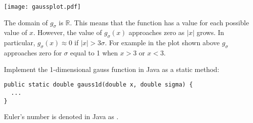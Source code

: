 \documentclass{book}
\begin{document}
\begin{center}
\texttt{[image: gaussplot.pdf]}
\end{center}

The domain of $g_\sigma$ is $\mathbb{R}$. This means that the function has a value for each possible value of $x$. However, the value of $g_\sigma(x)$ approaches zero as $|x|$ grows. In particular, $g_\sigma(x) \approx 0$ if $|x| > 3\sigma$. For example in the plot shown above $g_\sigma$ approaches zero for $\sigma$ equal to 1 when $x > 3$ or $x < 3$.  

\begin{exercise}
Implement the 1-dimensional gauss function in Java as a static method:
\begin{lstlisting}
public static double gauss1d(double x, double sigma) {
  ...
}
\end{lstlisting}
Euler's number is denoted in Java as .
\end{exercise}
\end{document}
